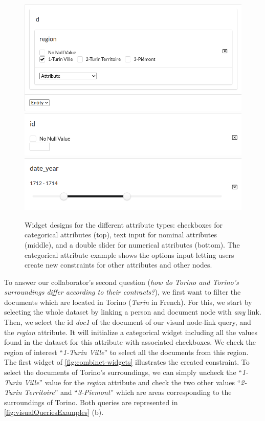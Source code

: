 \begin{figure}[!ht]
    \centering
    \includegraphics[width=0.7\linewidth]{static/figures/ComBiNet/OriginalPaperFigures/constraintRegion.png}\\
    \includegraphics[width=0.6\linewidth]{static/figures/ComBiNet/OriginalPaperFigures/nominalWidget}\\
    \includegraphics[width=0.6\linewidth]{static/figures/ComBiNet/OriginalPaperFigures/numericWidget}

    \caption{Widget designs for the different attribute types: checkboxes for categorical attributes (top), text input for nominal attributes (middle), and a double slider for numerical attributes (bottom). The categorical attribute example shows the options input letting users create new constraints for other attributes and other nodes.}\label{fig:combinet-widgets}
\end{figure}

To answer our collaborator's second question (\textit{how do Torino and Torino's surroundings differ according to their contracts?}), we first want to filter the documents which are located in Torino (\textit{Turin} in French).
For this, we start by selecting the whole dataset by linking a person and document node with \textit{any} link.
Then, we select the id \textit{doc1} of the document of our visual node-link query, and the \textit{region} attribute.
It will initialize a categorical widget including all the values found in the dataset for this attribute with associated checkboxes.
We check the region of interest ``\textit{1-Turin Ville}'' to select all the documents from this region.
 The first widget of \autoref{fig:combinet-widgets} illustrates the created constraint.
To select the documents of Torino's surroundings, we can simply uncheck the ``\textit{1-Turin Ville}'' value for the \textit{region} attribute and check the two other values ``\textit{2-Turin Territoire}'' and ``\textit{3-Piemont}'' which are areas corresponding to the surroundings of Torino.
Both queries are represented in \autoref{fig:visualQueriesExamples} (b).


